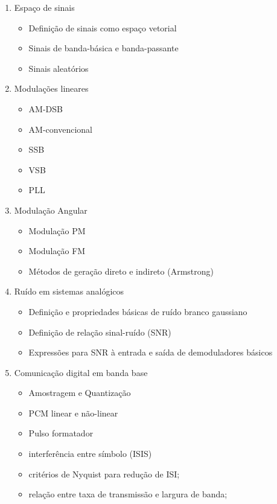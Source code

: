   \begin{enumerate}
      \item Espaço de sinais 
      \begin{itemize}
        \item Definição de sinais como espaço vetorial
        \item Sinais de banda-básica e banda-passante
        \item Sinais aleatórios
      \end{itemize}
      \item Modulações lineares
      \begin{itemize}
          \item AM-DSB
          \item AM-convencional
          \item SSB
          \item VSB
          \item PLL
      \end{itemize}
      \item Modulação Angular
        \begin{itemize}
          \item Modulação PM
          \item Modulação FM
          \item Métodos de geração direto e indireto (Armstrong)
      \end{itemize}
      \item Ruído em sistemas analógicos 
      \begin{itemize}
          \item Definição e propriedades básicas de ruído branco gaussiano
          \item Definição de relação sinal-ruído (SNR)
          \item Expressões para SNR à entrada e saída de demoduladores básicos
      \end{itemize}
      \item Comunicação digital em banda base 
      \begin{itemize}
          \item Amostragem e Quantização
          \item PCM linear e não-linear
          \item Pulso formatador
          \item interferência entre símbolo (ISIS)
          \item critérios de Nyquist para redução de ISI; \item relação entre taxa de transmissão e largura de banda;
      \end{itemize}
  \end{enumerate}
  
